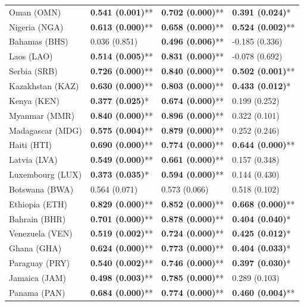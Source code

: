 \begin{longtable}{p{4cm}p{3cm}p{3cm}p{3cm}}
Oman (OMN) & \textbf{0.541 (0.001)}** & \textbf{0.702 (0.000)}** & \textbf{0.391 (0.024)}* \\
Nigeria (NGA) & \textbf{0.613 (0.000)}** & \textbf{0.658 (0.000)}** & \textbf{0.524 (0.002)}** \\
Bahamas (BHS) & 0.036 (0.851) & \textbf{0.496 (0.006)}** & -0.185 (0.336) \\
Laos (LAO) & \textbf{0.514 (0.005)}** & \textbf{0.831 (0.000)}** & -0.078 (0.692) \\
Serbia (SRB) & \textbf{0.726 (0.000)}** & \textbf{0.840 (0.000)}** & \textbf{0.502 (0.001)}** \\
Kazakhstan (KAZ) & \textbf{0.630 (0.000)}** & \textbf{0.803 (0.000)}** & \textbf{0.433 (0.012)}* \\
Kenya (KEN) & \textbf{0.377 (0.025)}* & \textbf{0.674 (0.000)}** & 0.199 (0.252) \\
Myanmar (MMR) & \textbf{0.840 (0.000)}** & \textbf{0.896 (0.000)}** & 0.322 (0.101) \\
Madagascar (MDG) & \textbf{0.575 (0.004)}** & \textbf{0.879 (0.000)}** & 0.252 (0.246) \\
Haiti (HTI) & \textbf{0.690 (0.000)}** & \textbf{0.774 (0.000)}** & \textbf{0.644 (0.000)}** \\
Latvia (LVA) & \textbf{0.549 (0.000)}** & \textbf{0.661 (0.000)}** & 0.157 (0.348) \\
Luxembourg (LUX) & \textbf{0.373 (0.035)}* & \textbf{0.594 (0.000)}** & 0.144 (0.430) \\
Botswana (BWA) & 0.564 (0.071) & 0.573 (0.066) & 0.518 (0.102) \\
Ethiopia (ETH) & \textbf{0.829 (0.000)}** & \textbf{0.852 (0.000)}** & \textbf{0.668 (0.000)}** \\
Bahrain (BHR) & \textbf{0.701 (0.000)}** & \textbf{0.878 (0.000)}** & \textbf{0.404 (0.040)}* \\
Venezuela (VEN) & \textbf{0.519 (0.002)}** & \textbf{0.724 (0.000)}** & \textbf{0.425 (0.012)}* \\
Ghana (GHA) & \textbf{0.624 (0.000)}** & \textbf{0.773 (0.000)}** & \textbf{0.404 (0.033)}* \\
Paraguay (PRY) & \textbf{0.540 (0.002)}** & \textbf{0.746 (0.000)}** & \textbf{0.397 (0.030)}* \\
Jamaica (JAM) & \textbf{0.498 (0.003)}** & \textbf{0.785 (0.000)}** & 0.289 (0.103) \\
Panama (PAN) & \textbf{0.684 (0.000)}** & \textbf{0.774 (0.000)}** & \textbf{0.460 (0.004)}** \\

\end{longtable}
